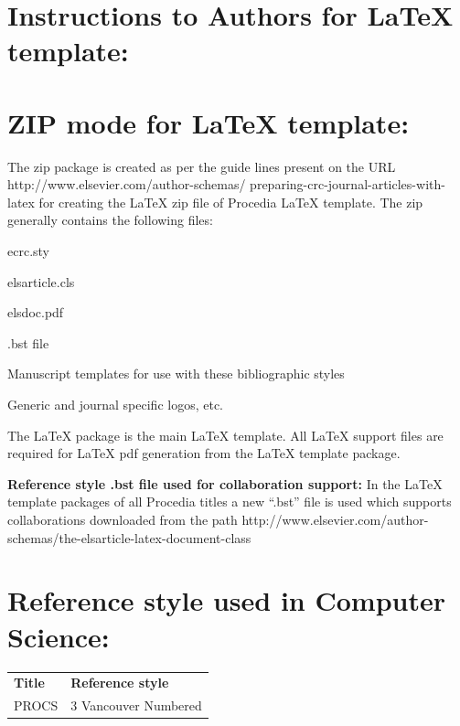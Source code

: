 \documentclass[3p,times,procedia]{elsarticle}
\begin{document}
\clearpage

\normalMode

\section*{Instructions to Authors for LaTeX template:}

\section{ZIP mode for LaTeX template:}

The zip package is created as per the guide lines present on the URL http://www.elsevier.com/author-schemas/ preparing-crc-journal-articles-with-latex for creating the LaTeX zip file of Procedia LaTeX template.  The zip generally contains the following files:
\begin{Itemize}[]\leftskip-17.7pt
\item ecrc.sty
\item  elsarticle.cls
\item elsdoc.pdf
\item .bst file
\item Manuscript templates for use with these bibliographic styles
\item  Generic and journal specific logos, etc.
\end{Itemize}

The LaTeX package is the main LaTeX template. All LaTeX support files are required for LaTeX pdf generation from the LaTeX template package. 

{\bf Reference style .bst file used for collaboration support:} In the LaTeX template packages of all Procedia titles a new ``.bst'' file is used which supports collaborations downloaded from the path http://www.elsevier.com/author-schemas/the-elsarticle-latex-document-class

\section{Reference style used in Computer Science:}
\let\footnotesize\normalsize
\hspace*{-10pt}\begin{tabular*}{\hsize}{@{}ll@{}}
{\bf Title}&{\bf Reference style} \\[6pt]
PROCS  & 3 Vancouver Numbered
\end{tabular*}
\end{document}
